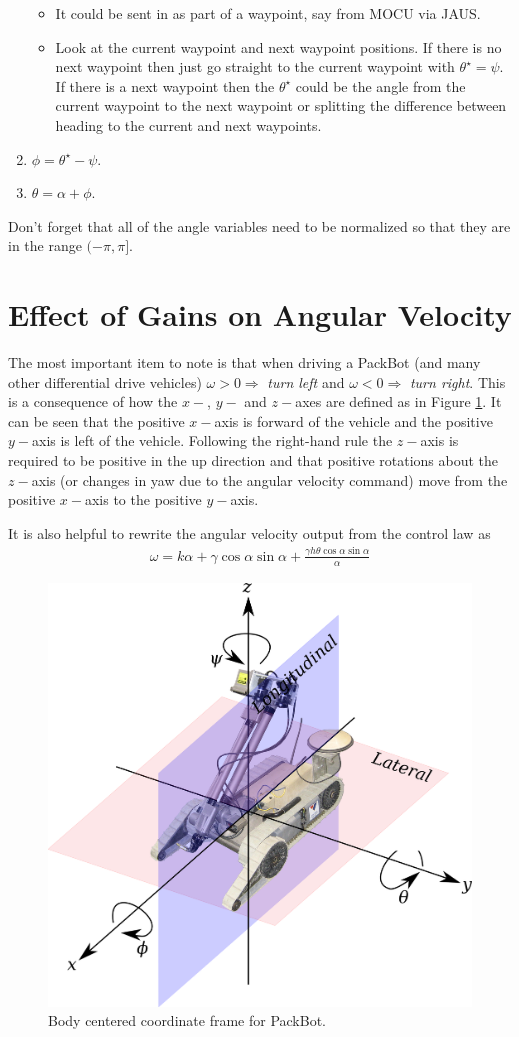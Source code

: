 \documentclass[12pt]{article}
\begin{document}
\begin{enumerate}
\begin{itemize}
\item It could be sent in as part of a waypoint, say from MOCU via JAUS.
\item Look at the current waypoint and next waypoint positions. If there is no next waypoint then just go straight to the current waypoint with $\theta^\star=\psi$. If there is a next waypoint then the $\theta^\star$ could be the angle from the current waypoint to the next waypoint or splitting the difference between heading to the current and next waypoints.
\end{itemize}
\item $\phi=\theta^\star-\psi$.
\item $\theta=\alpha + \phi$.
\end{enumerate}
Don't forget that all of the angle variables need to be normalized so that they are in the range $(-\pi,\pi]$.

\section{Effect of Gains on Angular Velocity}
The most important item to note is that when driving a PackBot (and many other differential drive vehicles) $\omega>0\Rightarrow$ \textit{turn left} and $\omega<0\Rightarrow$ \textit{turn right}. This is a consequence of how the $x-$, $y-$ and $z-$axes are defined as in Figure \ref{fig:packbotaxes}. It can be seen that the positive $x-$axis is forward of the vehicle and the positive $y-$axis is left of the vehicle. Following the right-hand rule the $z-$axis is required to be positive in the up direction and that positive rotations about the $z-$axis (or changes in yaw due to the angular velocity command) move from the positive $x-$axis to the positive $y-$axis.

It is also helpful to rewrite the angular velocity output from the control law as
\begin{align*}
\omega = k\alpha + \gamma\cos\alpha\sin\alpha + \frac{\gamma h\theta\cos\alpha\sin\alpha}{\alpha}
\end{align*}

\begin{figure}[ht!]
	\centering
	\includegraphics[width=.5\textwidth]{images/packbotaxes}
	\caption{Body centered coordinate frame for PackBot.}
	\label{fig:packbotaxes}
\end{figure}
\end{document}
